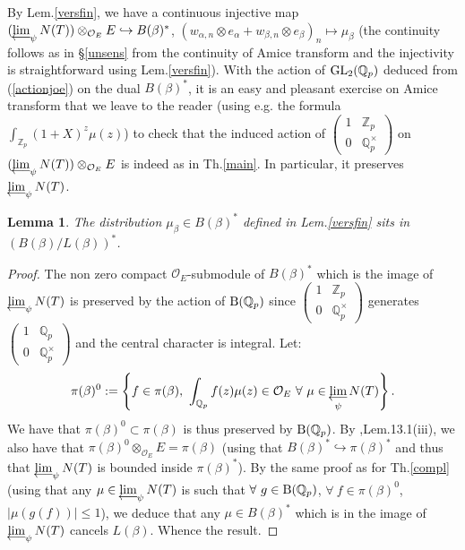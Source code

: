 \documentclass[11pt]{amsart}
\def\limproj{\mathop{\oalign{{\rm lim}\cr 
\hidewidth$\longleftarrow$\hidewidth\cr}}}
\def\Z{{\mathbb Z}_p}
\def\Q{{\mathbb Q}_p}
\def\G{{\rm GL}_2(\Q)}
\def\B{{\rm B}(\Q)}
\def\O{{\mathcal O}_E}
\newtheorem{lem}[definit]{\bf{Lemma}}
\begin{document}
By Lem.\ref{versfin}, we have a continuous injective map
$(\limproj_{\psi}N(T))\otimes_{\O}E\hookrightarrow B(\beta)^{*}$,
$(w_{\alpha,n}\otimes e_{\alpha}+w_{\beta,n}\otimes
e_{\beta})_n\mapsto \mu_{\beta}$ (the continuity follows as in
\S\ref{unsens} from the continuity of Amice transform and the
injectivity is straightforward using Lem.\ref{versfin}). With the
action of $\G$ deduced from (\ref{actionjoe}) on the dual
$B(\beta)^*$, it is an easy and pleasant exercise on Amice transform
that we leave to the reader (using e.g. the formula
$\int_{\Z}(1+X)^z\mu(z)$) to check that the induced action of
$\begin{pmatrix}1&\Z\\0&\Q^{\times}\end{pmatrix}$ on
$(\limproj_{\psi}N(T))\otimes_{\O}E$ is indeed as in Th.\ref{main}. In
particular, it preserves $\limproj_{\psi}N(T)$.  
 
\begin{lem}\label{versfin2} 
The distribution $\mu_{\beta}\in B(\beta)^*$ defined in
Lem.\ref{versfin} sits in $(B(\beta)/L(\beta))^*$.  
\end{lem} 
\begin{proof} 
The non zero compact $\O$-submodule of $B(\beta)^*$ which is the image
of $\limproj_{\psi}N(T)$ is preserved by the action of $\B$ since
$\begin{pmatrix}1&\Z\\0&\Q^{\times}\end{pmatrix}$ generates
$\begin{pmatrix}1&\Q\\0&\Q^{\times}\end{pmatrix}$ and the central
character is integral. Let:  
$$\pi(\beta)^0:=\left\{f\in \pi(\beta),\ \int_{\Q}f(z)\mu(z)\in \O\
\forall\ \mu\in\limproj_{\psi}N(T)\right\}.$$  
We have that $\pi(\beta)^0\!\!\subset \pi(\beta)$ is thus preserved by
$\B$. By \cite{Schn},Lem.13.1(iii), we also have that
$\pi(\beta)^0\otimes_{\O}E=\pi(\beta)$ (using that $B(\beta)^*\hookrightarrow \pi(\beta)^*$ and thus that $\limproj_{\psi}N(T)$ is bounded inside $\pi(\beta)^*$). By the same proof as for Th.\ref{compl} (using that any
$\mu\in \limproj_{\psi}N(T)$ is such that $\forall\ g\in\B$, $\forall\
f\in \pi(\beta)^0$, $|\mu(g(f))|\leq 1$), we deduce that any $\mu\in
B(\beta)^*$ which is in the image of $\limproj_{\psi}N(T)$ cancels
$L(\beta)$. Whence the result.  
\end{proof} 
 
\end{document}
